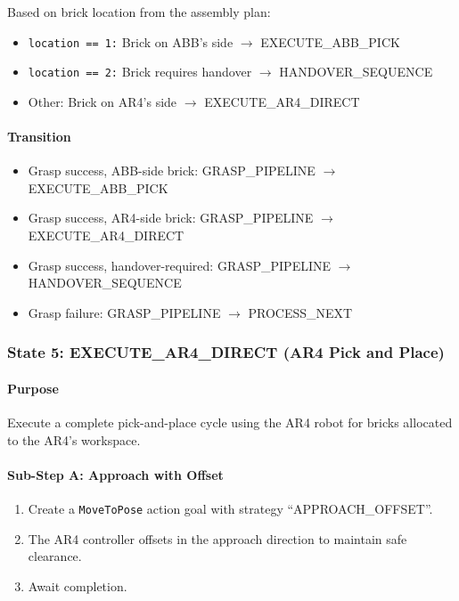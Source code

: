 Based on brick location from the assembly plan:
\begin{itemize}
    \item \texttt{location == 1:} Brick on ABB's side $\rightarrow$ EXECUTE\_ABB\_PICK
    \item \texttt{location == 2:} Brick requires handover $\rightarrow$ HANDOVER\_SEQUENCE
    \item Other: Brick on AR4's side $\rightarrow$ EXECUTE\_AR4\_DIRECT
\end{itemize}

\paragraph{Transition}

\begin{itemize}
    \item Grasp success, ABB-side brick: GRASP\_PIPELINE $\rightarrow$ EXECUTE\_ABB\_PICK
    \item Grasp success, AR4-side brick: GRASP\_PIPELINE $\rightarrow$ EXECUTE\_AR4\_DIRECT
    \item Grasp success, handover-required: GRASP\_PIPELINE $\rightarrow$ HANDOVER\_SEQUENCE
    \item Grasp failure: GRASP\_PIPELINE $\rightarrow$ PROCESS\_NEXT
\end{itemize}

\subsubsection{State 5: EXECUTE\_AR4\_DIRECT (AR4 Pick and Place)}
\label{state:executeAR4direct}

\paragraph{Purpose}

Execute a complete pick-and-place cycle using the AR4 robot for bricks allocated to the AR4's workspace.

\paragraph{Sub-Step A: Approach with Offset}

\begin{enumerate}
    \item Create a \texttt{MoveToPose} action goal with strategy ``APPROACH\_OFFSET''.
    \item The AR4 controller offsets in the approach direction to maintain safe clearance.
    \item Await completion.
\end{enumerate}

